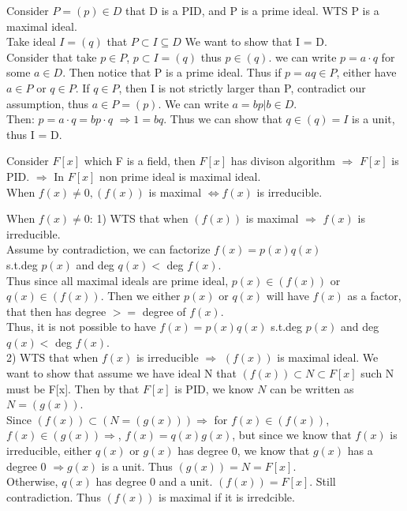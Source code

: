 \documentclass{article}
\begin{document}
\begin{Proof}
    Consider $P= (p) \in D$ that D is a PID, and P is a prime ideal. WTS P is a maximal ideal.
    \\Take ideal $I = (q)$ that $P\subset I \subseteq D$ We want to show that I = D.
   \\ Consider that take $p \in P$, $ p\subset I = (q)$ thus $p \in (q)$. we can write $p = a \cdot q$ for some $a \in D$. Then notice that P is a prime ideal. Thus if $p = aq \in P$, either have $a \in P$ or $q \in P$. If $q \in P$, then I is not strictly larger than P, contradict our assumption, thus $a \in P = (p)$.  We can write $a = bp | b \in D$.
   \\Then: $p = a \cdot q = bp \cdot q$  $\Rightarrow 1= bq.$ Thus we can show that $q \in (q) = I$ is a unit, thus I = D.  
   
\end{Proof}

\begin{Example}
    Consider $F[x]$ which F is a field, then $F[x]$ has divison algorithm $\Rightarrow$ $F[x]$ is PID. $\Rightarrow$ In $F[x]$ non prime ideal is maximal ideal.
    \\ When $f(x) \neq 0, (f(x))$ is maximal $\Leftrightarrow f(x)$ is irreducible.
\end{Example}

\begin{Proof}
When $f(x) \neq 0$:
  1)   WTS that when $(f(x))$ is maximal $\Rightarrow$ $f(x)$ is irreducible. 
    \\ Assume by contradiction, we can factorize $f(x) = p(x)q(x)$ \\ s.t.deg $p(x)$ and deg $q(x) <$ deg $f(x)$. 
    \\ Thus since all maximal ideals are prime ideal, $p(x) \in (f(x))$ or $q(x) \in (f(x))$. Then we either $p(x)$ or $q(x)$ will have $f(x)$ as a factor, that then has degree $>=$ degree of $f(x)$.
    \\Thus, it is not possible to have $f(x) = p(x)q(x)$ s.t.deg $p(x)$ and deg $q(x) <$ deg $f(x)$. 
\\
2)  WTS that when $f(x)$ is irreducible $\Rightarrow$ $(f(x))$ is maximal ideal. We want to show that assume we have ideal N that $(f(x)) \subset N \subset F[x]$ such N must be F[x]. Then by that $F[x]$ is PID, we know $N$ can be written as $N = (g(x))$. 
\\Since $(f(x)) \subset (N = (g(x)) )\Rightarrow $
for $f(x) \in (f(x))$, $f(x) \in (g(x)) \Rightarrow$, $f(x) = q(x)g(x)$, but since we know that $f(x)$ is irreducible, either $q(x)$ or $g(x)$ has degree 0, we know that $g(x)$ has a degree 0 $\Rightarrow g(x)$ is a unit. Thus $(g(x))= N = F[x]$.
\\Otherwise, $q(x)$ has degree 0 and a unit. $(f(x)) = F[x]$. Still contradiction. Thus $(f(x))$ is maximal if it is irredcible. 
\end{Proof}
\end{document}
